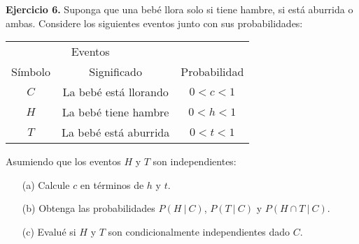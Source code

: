 \documentclass[12pt]{article}
\begin{document}
\textbf{Ejercicio 6.} Suponga que una bebé llora solo si tiene hambre, si está aburrida o ambas. Considere los siguientes eventos junto con sus probabilidades:

\begin{table}[hbt!]
\centering

\renewcommand{\arraystretch}{1.3}

\begin{tabular}{c c c}
\hline
\multicolumn{2}{c}{Eventos} & \\
\cline{1-2}
Símbolo & Significado & Probabilidad \\
\hline
$C$ & La bebé está llorando & $0 < c < 1$ \\
$H$ & La bebé tiene hambre & $0 < h < 1$ \\
$T$ & La bebé está aburrida & $0 < t < 1$ \\
\hline
\end{tabular}
\end{table}

Asumiendo que los eventos $H$ y $T$ son independientes:

\begin{itemize}
\item[(a)] Calcule $c$ en términos de $h$ y $t$.
\item[(b)] Obtenga las probabilidades $P(H \ | \ C)$, $P(T \ | \ C)$ y $P(H \cap T \ | \ C)$.
\item[(c)] Evalué si $H$ y $T$ son condicionalmente independientes dado $C$.
\end{itemize}
\end{document}
